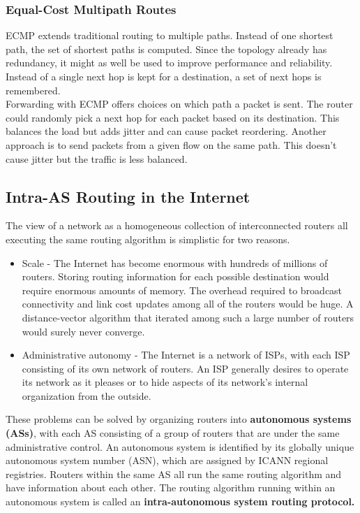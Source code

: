 \subsubsection{Equal-Cost Multipath Routes}
ECMP extends traditional routing to multiple paths. Instead of one shortest path, the set of shortest paths is computed. Since the topology already has redundancy, it might as well be used to improve performance and reliability. Instead of a single next hop is kept for a destination, a set of next hops is remembered.\\
Forwarding with ECMP offers choices on which path a packet is sent. The router could randomly pick a next hop for each packet based on its destination. This balances the load but adds jitter and can cause packet reordering. Another approach is to send packets from a given flow on the same path. This doesn't cause jitter but the traffic is less balanced.

\subsection{Intra-AS Routing in the Internet}
The view of a network as a homogeneous collection of interconnected routers all executing the same routing algorithm is simplistic for two reasons. 
\begin{itemize}
\item Scale - The Internet has become enormous with hundreds of millions of routers. Storing routing information for each possible destination would require enormous amounts of memory. The overhead required to broadcast connectivity and link cost updates among all of the routers would be huge. A distance-vector algorithm that iterated among such a large number of routers would surely never converge.
\item Administrative autonomy - The Internet is a network of ISPs, with each ISP consisting of its own network of routers. An ISP generally desires to operate its network as it pleases or to hide aspects of its network's internal organization from the outside.
\end{itemize}
These problems can be solved by organizing routers into \textbf{autonomous systems (ASs)}, with each AS consisting of a group of routers that are under the same administrative control. An autonomous system is identified by its globally unique autonomous system number (ASN), which are assigned by ICANN regional registries. Routers within the same AS all run the same routing algorithm and have information about each other. The routing algorithm running within an autonomous system is called an \textbf{intra-autonomous system routing protocol.}

